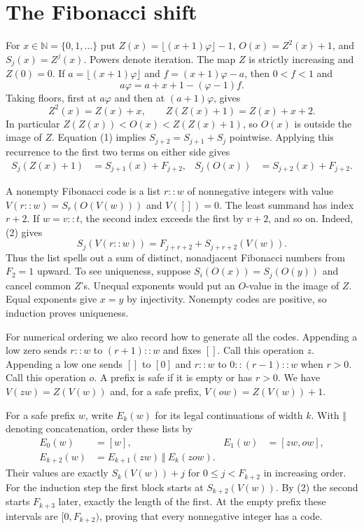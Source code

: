 \documentclass[11pt]{article}
\newcommand{\N}{\mathbb N}
\newcommand{\ph}{\varphi}
\begin{document}
\newpage
\section{The Fibonacci shift}
For $x\in\N=\{0,1,\ldots\}$ put $Z(x)=\lfloor(x+1)\ph\rfloor-1$,
$O(x)=Z^2(x)+1$, and $S_j(x)=Z^j(x)$. Powers denote iteration.
The map $Z$ is strictly increasing and $Z(0)=0$. If
$a=\lfloor(x+1)\ph\rfloor$ and $f=(x+1)\ph-a$, then $0<f<1$ and
\[
 a\ph=a+x+1-(\ph-1)f.
\]
Taking floors, first at $a\ph$ and then at $(a+1)\ph$, gives
\[
 Z^2(x)=Z(x)+x,\qquad Z(Z(x)+1)=Z(x)+x+2.                 \tag{1}
\]
In particular $Z(Z(x))<O(x)<Z(Z(x)+1)$, so $O(x)$ is outside the image
of $Z$. Equation (1) implies $S_{j+2}=S_{j+1}+S_j$ pointwise. Applying this
recurrence to the first two terms on either side gives
\begin{align}
 S_j(Z(x)+1)&=S_{j+1}(x)+F_{j+2},&
 S_j(O(x))&=S_{j+2}(x)+F_{j+2}.                         \tag{2}
\end{align}

A nonempty Fibonacci code is a list $r::w$ of nonnegative integers with
value $V(r::w)=S_r(O(V(w)))$ and $V([])=0$. The least summand has index
$r+2$. If $w=v::t$, the second index exceeds the first by $v+2$, and so on.
Indeed, (2) gives
\[
 S_j(V(r::w))=F_{j+r+2}+S_{j+r+2}(V(w)).
\]
Thus the list spells out a sum of distinct, nonadjacent Fibonacci numbers
from $F_2=1$ upward. To see uniqueness, suppose
$S_i(O(x))=S_j(O(y))$ and cancel common $Z$'s. Unequal exponents would put
an $O$-value in the image of $Z$. Equal exponents give $x=y$ by injectivity.
Nonempty codes are positive, so induction proves uniqueness.

For numerical ordering we also record how to generate all the codes.
Appending a low zero sends $r::w$ to $(r+1)::w$ and fixes $[]$. Call this
operation $z$. Appending a low one sends $[]$ to $[0]$ and $r::w$ to
$0::(r-1)::w$ when $r>0$. Call this operation $o$. A prefix is safe if it
is empty or has $r>0$. We have $V(zw)=Z(V(w))$ and, for a safe prefix,
$V(ow)=Z(V(w))+1$.

For a safe prefix $w$, write $E_k(w)$ for its legal continuations of
width $k$. With $\Vert$ denoting concatenation, order these lists by
\begin{align*}
 E_0(w)&=[w], & E_1(w)&=[zw,ow],\\
 E_{k+2}(w)&=E_{k+1}(zw)\ \Vert\ E_k(zow).
\end{align*}
Their values are exactly $S_k(V(w))+j$ for $0\le j<F_{k+2}$ in increasing
order. For the induction step the first block starts at $S_{k+2}(V(w))$.
By (2) the second starts $F_{k+3}$ later, exactly the length of the first.
At the empty prefix these intervals are $[0,F_{k+2})$, proving that every
nonnegative integer has a code.
\end{document}
